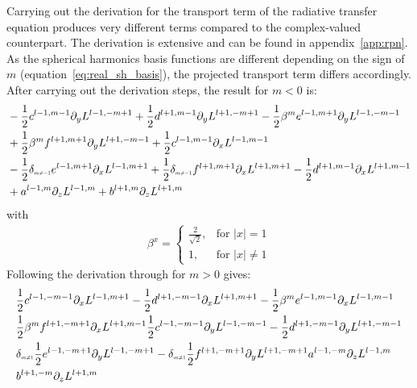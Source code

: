 Carrying out the derivation for the transport term of the radiative transfer equation produces very different terms compared to the complex-valued counterpart. The derivation is extensive and can be found in appendix~\ref{app:rpn}. As the spherical harmonics basis functions are different depending on the sign of $m$ (equation~\ref{eq:real_sh_basis}), the projected transport term differs accordingly. After carrying out the derivation steps, the result for $m<0$ is:
\begin{align*}
&-\frac{1}{2}c^{{l-1,m-1}}
\partial_y
L^{l-1,-m+1}
+\frac{1}{2}d^{{l+1,m-1}}
\partial_y
L^{l+1,-m+1}
-\frac{1}{2}\beta^{m}e^{{l-1,m+1}}
\partial_y
L^{l-1,-m-1}
\\&
+\frac{1}{2}\beta^{m}f^{{l+1,m+1}}
\partial_y
L^{l+1,-m-1}
+\frac{1}{2}c^{{l-1,m-1}}
\partial_x
L^{l-1,m-1}
\\&
-\frac{1}{2}\delta_{\scaleto{m\neq -1}{4pt}}e^{{l-1,m+1}}
\partial_x
L^{l-1,m+1}
+\frac{1}{2}\delta_{\scaleto{m\neq -1}{4pt}}f^{{l+1,m+1}}
\partial_x
L^{l+1,m+1}
-\frac{1}{2}d^{{l+1,m-1}}
\partial_x
L^{l+1,m-1}
\\&
+a^{{l-1,m}}
\partial_z
L^{l-1,m}
+b^{{l+1,m}}
\partial_z
L^{l+1,m}
\end{align*}
with
\begin{align}
\label{eq:real_sh_basis}
\beta^{x}=
\left\{
\begin{array}{lr}
\frac{2}{\sqrt{2}}, & \text{for } \vert x\vert = 1\\
1, & \text{for } \vert x\vert \neq 1
\end{array}
\right.
\end{align}
Following the derivation through for $m>0$ gives:
\begin{align}
&
\frac{1}{2}c^{l-1,-m-1}\partial_x L^{l-1,m+1}
-\frac{1}{2}d^{l+1,-m-1}\partial_x L^{l+1,m+1}
-\frac{1}{2}\beta^{m}e^{l-1,m-1}\partial_x L^{l-1,m-1}
\nonumber
\\&
\frac{1}{2}\beta^{m}f^{l+1,-m+1}\partial_x L^{l+1,m-1}
\frac{1}{2}c^{l-1,-m-1}\partial_y L^{l-1,-m-1}
-\frac{1}{2}d^{l+1,-m-1}\partial_y L^{l+1,-m-1}
\nonumber
\\&
\delta_{\scaleto{m\neq 1}{4pt}}\frac{1}{2}e^{l-1,-m+1}\partial_y L^{l-1,-m+1}
-\delta_{\scaleto{m\neq 1}{4pt}}\frac{1}{2}f^{l+1,-m+1}\partial_y L^{l+1,-m+1}
a^{l-1,-m}\partial_z L^{l-1,m}
\nonumber
\\&
b^{l+1,-m}\partial_z L^{l+1,m}
\nonumber
\end{align}
